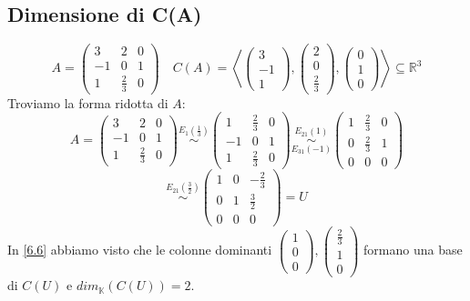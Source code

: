 \documentclass[a4paper]{article}
\theoremstyle{break}
\theoremstyle{break}
\theoremstyle{break}
\theoremstyle{break}
\begin{document}
\subsection{Dimensione di C(A)}
\begin{example}
  \[
  A = \begin{pmatrix} 
    3 & 2 & 0\\
    -1 & 0 & 1\\
    1 & \frac{2}{3} & 0
  \end{pmatrix} 
  \quad
  C(A) = \left<
  \begin{pmatrix} 
    3\\-1\\1
  \end{pmatrix},
  \begin{pmatrix} 
    2\\0\\\frac{2}{3}
  \end{pmatrix},
  \begin{pmatrix} 
    0\\1\\0
  \end{pmatrix}
  \right> \subseteq \mathbb{R}^3
  \] 
  Troviamo la forma ridotta di \( A \):
  \[
  A = \begin{pmatrix} 
    3 & 2 & 0\\
    -1 & 0 & 1\\
    1 & \frac{2}{3} & 0
  \end{pmatrix} 
  \stackrel{E_1(\frac{1}{3})}{\sim}
  \begin{pmatrix} 
    1 & \frac{2}{3} & 0\\
    -1 & 0 & 1\\
    1 & \frac{2}{3} & 0
  \end{pmatrix} 
  \stackrel{E_{21}(1)}{\underset{E_{31}(-1)}{\sim}}
  \begin{pmatrix} 
    1 & \frac{2}{3} & 0\\
    0 & \frac{2}{3} & 1\\
    0 & 0 & 0
  \end{pmatrix} 
  \] 
  \[
  \stackrel{E_{21}(\frac{3}{2})}{\sim}
  \begin{pmatrix} 
    1 & 0 & -\frac{2}{3}\\
    0 & 1 & \frac{3}{2}\\
    0 & 0 & 0
  \end{pmatrix}
  = U
  \] 
  In \ref{6.6} abbiamo visto che le colonne dominanti \( \begin{pmatrix} 
    1\\0\\0
  \end{pmatrix},
  \begin{pmatrix} 
    \frac{2}{3}\\1\\0
  \end{pmatrix} \) formano una base di \( C(U) \) e \( dim_{\mathbb{K}}(C(U)) = 2 \).


\end{example}
\end{document}
